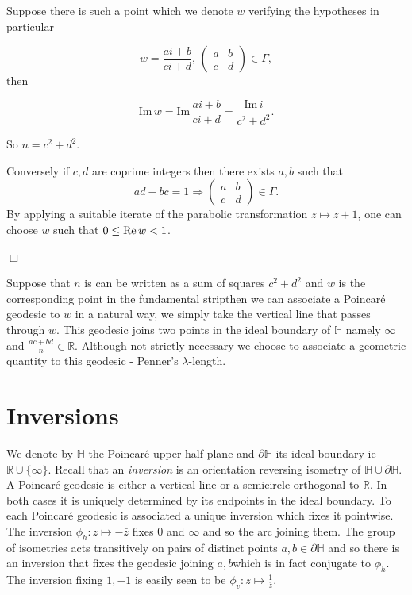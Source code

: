 \documentclass[12pt,a4paper]{amsart}
\def\rh{\phi_h}
\def\rv{\phi_v}
\def\dHH{\partial \mathbb{H}}
\def\im{\mathrm{Im}\,}
\begin{document}
\proof  Suppose there is such a point which we denote  $w$
verifying the hypotheses in particular

$$w = \frac{ai + b}{ci + d},\, \begin{pmatrix} a&b\\c&d
\end{pmatrix} \in \Gamma,$$
then

$$\im w = \im  \frac{ai +b}{ci+d } = \frac{\im i} {c^2 + d^2}.$$

So $n = c^2 + d^2$.

Conversely if $c,d$ are coprime integers 
 then there exists $a,b$ such that
 $$ad - bc = 1 \Rightarrow  
 \begin{pmatrix}
 a & b \\
 c & d
 \end{pmatrix} \in \Gamma.
$$
By applying a suitable iterate of the parabolic transformation 
$z \mapsto z + 1$,
one can choose $w$ such that $0 \leq \text{Re\,} w < 1$.

\hfill $\Box$

Suppose that $n$ is can be written as a sum of squares $c^2 +d^2$
and $w$ is the corresponding point in the fundamental stripthen we
can associate a Poincaré geodesic to $w$ in a natural way, 
we simply take the vertical line that passes through $w$.
This geodesic joins two points in the ideal boundary of $\mathbb{H}$
namely $\infty$ and $\frac{ac + bd}{n}\in \mathbb{R}$.
Although not strictly necessary we choose to associate a geometric
quantity to this geodesic - Penner's $\lambda$-length.



\section{Inversions}

We denote by $\mathbb{H}$ the Poincaré upper half plane and $\dHH$
its ideal boundary ie $\mathbb{R}\cup \{\infty\}$.
Recall that an \textit{inversion} is an orientation reversing
isometry of $\mathbb{H}\cup \dHH$. 
A Poincaré geodesic is either a vertical line or a semicircle
orthogonal to $\mathbb{R}$.
In both cases it is uniquely determined by its endpoints in the
ideal boundary.
To each Poincaré geodesic is associated a unique inversion which fixes it pointwise. 
The inversion
$\rh: z\mapsto -\bar{z}$ fixes $0$ and $\infty$ 
and so the arc joining them.
The group of isometries acts transitively on pairs of distinct
points $a,b \in \partial \mathbb{H}$ and so
there is an inversion that fixes the geodesic joining $a,b$which is
in fact conjugate to $\rh$.
The inversion fixing $1,-1$ is easily seen to be
$\rv:z\mapsto \frac{1}{\bar{z}}$. 
\end{document}
